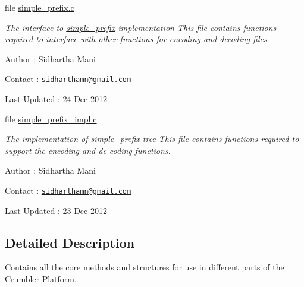 \begin{DoxyCompactItemize}
\begin{DoxyCompactList}
 \end{DoxyCompactList}\item 
file \hyperlink{simple__prefix_8c}{simple\-\_\-prefix.\-c}
\begin{DoxyCompactList}\small\item\em The interface to \hyperlink{structsimple__prefix}{simple\-\_\-prefix} implementation This file contains functions required to interface with other functions for encoding and decoding files\par
 Author \-: Sidhartha Mani\par
 Contact \-: \href{mailto:sidharthamn@gmail.com}{\tt sidharthamn@gmail.\-com} \par
 Last Updated \-: 24 Dec 2012 \par
 \end{DoxyCompactList}\item 
file \hyperlink{simple__prefix__impl_8c}{simple\-\_\-prefix\-\_\-impl.\-c}
\begin{DoxyCompactList}\small\item\em The implementation of \hyperlink{structsimple__prefix}{simple\-\_\-prefix} tree This file contains functions required to support the encoding and de-\/coding functions.\par
 Author \-: Sidhartha Mani\par
 Contact \-: \href{mailto:sidharthamn@gmail.com}{\tt sidharthamn@gmail.\-com} \par
 Last Updated \-: 23 Dec 2012 \par
 \end{DoxyCompactList}\end{DoxyCompactItemize}


\subsection{Detailed Description}
Contains all the core methods and structures for use in different parts of the Crumbler Platform. 
